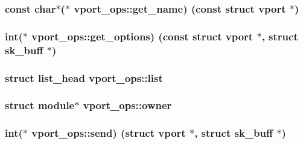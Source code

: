\subsubsection[{get\+\_\+name}]{\setlength{\rightskip}{0pt plus 5cm}const char$\ast$($\ast$ vport\+\_\+ops\+::get\+\_\+name) (const struct {\bf vport} $\ast$)}\label{structvport__ops_abe0c3315271724bf05338487e0ced13c}
\hypertarget{structvport__ops_aacbd431343ae726a067b66b9b9de8ec4}{}
\subsubsection[{get\+\_\+options}]{\setlength{\rightskip}{0pt plus 5cm}int($\ast$ vport\+\_\+ops\+::get\+\_\+options) (const struct {\bf vport} $\ast$, struct sk\+\_\+buff $\ast$)}\label{structvport__ops_aacbd431343ae726a067b66b9b9de8ec4}
\hypertarget{structvport__ops_aa0eadb49f41db4919e247ce17dd77aed}{}
\subsubsection[{list}]{\setlength{\rightskip}{0pt plus 5cm}struct list\+\_\+head vport\+\_\+ops\+::list}\label{structvport__ops_aa0eadb49f41db4919e247ce17dd77aed}
\hypertarget{structvport__ops_a74f3e852dbe8137d21e87895bd5f94e9}{}
\subsubsection[{owner}]{\setlength{\rightskip}{0pt plus 5cm}struct module$\ast$ vport\+\_\+ops\+::owner}\label{structvport__ops_a74f3e852dbe8137d21e87895bd5f94e9}
\hypertarget{structvport__ops_a70034105b72fdde6d137bbc7e5d55a6a}{}
\subsubsection[{send}]{\setlength{\rightskip}{0pt plus 5cm}int($\ast$ vport\+\_\+ops\+::send) (struct {\bf vport} $\ast$, struct sk\+\_\+buff $\ast$)}\label{structvport__ops_a70034105b72fdde6d137bbc7e5d55a6a}
\hypertarget{structvport__ops_a2a99b53de4cfaeaf8fb88d41660f5e73}{}
